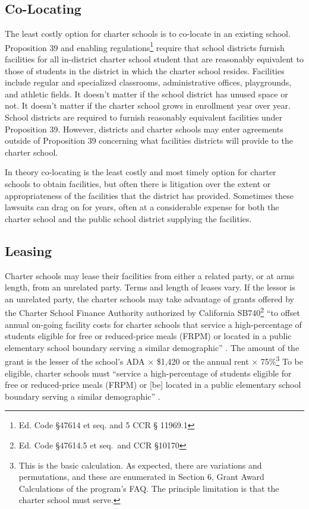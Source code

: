 \subsection{Co-Locating}
\label{sec:co-locating}\indent

The least costly option for charter schools is to co-locate in an existing school. Proposition 39 and enabling regulations\footnote{Ed. Code §47614 et seq. and 5 CCR § 11969.1} require that school districts furnish facilities for all in-district charter school student that are reasonably equivalent to those of students in the district in which the charter school resides. Facilities include regular and specialized classrooms, administrative offices, playgrounds, and athletic fields. It doesn't matter if the school district has unused space or not. It doesn't matter if the charter school grows in enrollment year over year. School districts are required to furnish reasonably equivalent facilities under Proposition 39. However, districts and charter schools may enter agreements outside of Proposition 39 concerning what facilities districts will provide to the charter school.

In theory co-locating is the least costly and most timely option for charter schools to obtain facilities, but often there is litigation over the extent or appropriateness of the facilities that the district has provided. Sometimes these lawsuits can drag on for years, often at a considerable expense for both the charter school and the public school district supplying the facilities.

\subsection{Leasing}\label{sec:leasing}\indent

Charter schools may lease their facilities from either a related party, or at arms length, from an unrelated party. Terms and length of leases vary. If the lessor is an unrelated party, the charter schools may take advantage of grants offered by the Charter School Finance Authority authorized by California SB740\footnote{Ed. Code §47614.5 et seq. and CCR §10170 } ``to offset annual on-going facility costs for charter schools that service a high-percentage of students eligible for free or reduced-price meals (FRPM) or located in a public elementary school boundary serving a similar demographic'' \parencite{CATreasurer2023}. The amount of the grant is the lesser of the school's ADA × \$1,420 or the annual rent × 75\%\footnote{This is the basic calculation. As expected, there are variations and permutations, and these are enumerated in Section 6, Grant Award Calculations of the program's FAQ\@. The principle limitation is that the charter school must serve.} To be eligible, charter schools must ``service a high-percentage of students eligible for free or reduced-price meals (FRPM) or [be] located in a public elementary school boundary serving a similar demographic'' \parencite{CATreasurer2023}.

